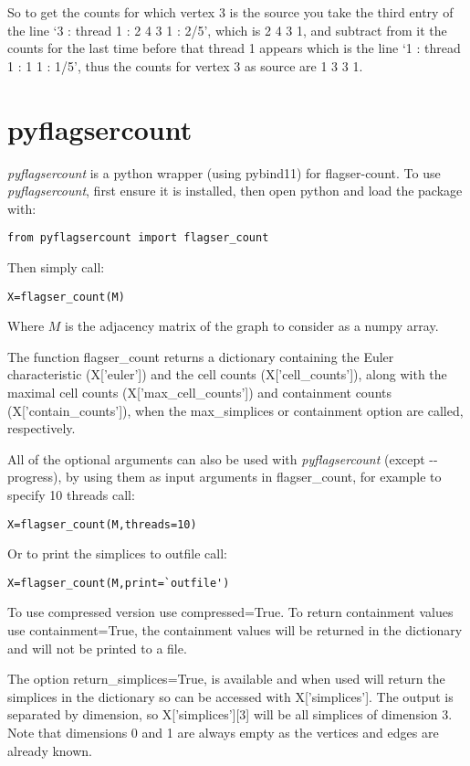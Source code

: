 \documentclass{amsart}
\theoremstyle{definition}
\begin{document}
So to get the counts for which vertex 3 is the source you take the third entry of the line `3 : thread 1 : 2 4 3 1  : 2/5', which is 2 4 3 1, and subtract from it the counts for the last time before that thread 1 appears which is the line `1 : thread 1 : 1 1  : 1/5', thus the counts for vertex 3 as source are 1 3 3 1.


\section{pyflagsercount}
\textit{pyflagsercount} is a python wrapper (using pybind11) for flagser-count.
To use \textit{pyflagsercount}, first ensure it is installed, then open python and load the package with:
\begin{verbatim}from pyflagsercount import flagser_count\end{verbatim}
Then simply call:
\begin{verbatim}X=flagser_count(M)\end{verbatim}
Where $M$ is the adjacency matrix of the graph to consider as a numpy array.

The function flagser\_count returns a dictionary containing the Euler characteristic (X['euler']) and the cell counts (X['cell\_counts']), along with the maximal cell counts (X['max\_cell\_counts']) and containment counts (X['contain\_counts']), when the max\_simplices or containment option are called, respectively.

All of the optional arguments can also be used with \textit{pyflagsercount} (except -{}-progress), by using them as input arguments in flagser\_count, for example to specify 10 threads call:
\begin{verbatim}X=flagser_count(M,threads=10)\end{verbatim}
Or to print the simplices to outfile call:
\begin{verbatim}X=flagser_count(M,print=`outfile')\end{verbatim}

To use compressed version use compressed=True. To return containment values use containment=True, the containment values will be returned in the dictionary and will not be printed to a file. 

The option return\_simplices=True, is available and when used will return the simplices in the dictionary so can be accessed with X['simplices']. The output is separated by dimension, so X['simplices'][3] will be all simplices of dimension 3. Note that dimensions 0 and 1 are always empty as the vertices and edges are already known.
\end{document}
